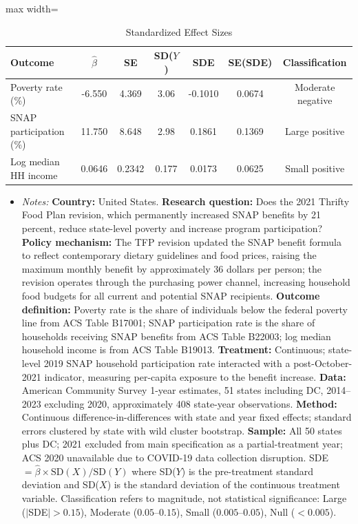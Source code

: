 \begin{table}[htbp]
\centering
\caption{Standardized Effect Sizes}
\label{tab:sde}
\begin{adjustbox}{max width=\textwidth}
\begin{tabular}{lcccccc}
\hline\hline
Outcome & $\hat{\beta}$ & SE & SD($Y$) & SDE & SE(SDE) & Classification \\
\hline
Poverty rate (\%) & -6.550 & 4.369 & 3.06 & -0.1010 & 0.0674 & Moderate negative \\
SNAP participation (\%) & 11.750 & 8.648 & 2.98 & 0.1861 & 0.1369 & Large positive \\
Log median HH income & 0.0646 & 0.2342 & 0.177 & 0.0173 & 0.0625 & Small positive \\
\hline\hline
\end{tabular}
\end{adjustbox}
\par\vspace{0.3em}
\begin{minipage}{0.95\textwidth}
{\footnotesize
\begin{itemize}[leftmargin=*]
\item \textit{Notes:} \textbf{Country:} United States. \textbf{Research question:} Does the 2021 Thrifty Food Plan revision, which permanently increased SNAP benefits by 21 percent, reduce state-level poverty and increase program participation? \textbf{Policy mechanism:} The TFP revision updated the SNAP benefit formula to reflect contemporary dietary guidelines and food prices, raising the maximum monthly benefit by approximately 36 dollars per person; the revision operates through the purchasing power channel, increasing household food budgets for all current and potential SNAP recipients. \textbf{Outcome definition:} Poverty rate is the share of individuals below the federal poverty line from ACS Table B17001; SNAP participation rate is the share of households receiving SNAP benefits from ACS Table B22003; log median household income is from ACS Table B19013. \textbf{Treatment:} Continuous; state-level 2019 SNAP household participation rate interacted with a post-October-2021 indicator, measuring per-capita exposure to the benefit increase. \textbf{Data:} American Community Survey 1-year estimates, 51 states including DC, 2014--2023 excluding 2020, approximately 408 state-year observations. \textbf{Method:} Continuous difference-in-differences with state and year fixed effects; standard errors clustered by state with wild cluster bootstrap. \textbf{Sample:} All 50 states plus DC; 2021 excluded from main specification as a partial-treatment year; ACS 2020 unavailable due to COVID-19 data collection disruption. SDE $= \hat{\beta} \times \text{SD}(X) / \text{SD}(Y)$ where SD($Y$) is the pre-treatment standard deviation and SD($X$) is the standard deviation of the continuous treatment variable. Classification refers to magnitude, not statistical significance: Large ($|$SDE$| > 0.15$), Moderate ($0.05$--$0.15$), Small ($0.005$--$0.05$), Null ($< 0.005$).
\end{itemize}}
\end{minipage}
\end{table}
